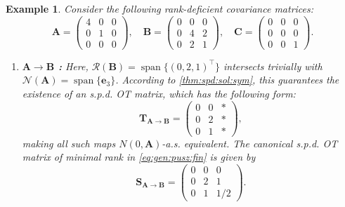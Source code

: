 \documentclass[noinfoline]{imsart}\setcounter{tocdepth}{2}
\newcommand{\m}[1]{\mathbf{#1}} %
\renewcommand{\c}[1]{\mathcal{#1}} %
\DeclareMathOperator*{\spann}{span}
\theoremstyle{plain}
\newtheorem{example}{Example}[section]
\begin{document}
\begin{example}\label{ex:spd:ex}
Consider the following rank-deficient covariance matrices:
\begin{equation*}
    \m{A} = \begin{pmatrix}
    4 & 0 & 0 \\
    0 & 1 & 0 \\
    0 & 0 & 0
    \end{pmatrix}, \quad \m{B} = \begin{pmatrix}
    0 & 0 & 0 \\
    0 & 4 & 2 \\
    0 & 2 & 1
    \end{pmatrix}, \quad \m{C} = \begin{pmatrix}
    0 & 0 & 0 \\
    0 & 0 & 0 \\
    0 & 0 & 1
    \end{pmatrix}.
\end{equation*}

\begin{enumerate}[leftmargin = *]
\item \textbf{$\m{A} \to \m{B}$ :} Here, $\c{R}(\m{B}) = \spann \{(0, 2, 1)^{\top}\}$ intersects trivially with $\c{N}(\m{A}) = \spann \{\m{e}_{3}\}$. According to \cref{thm:spd:sol:sym}, this guarantees the existence of an s.p.d. OT matrix, which has the following form:
\begin{equation*}
    \m{T}_{\m{A} \to \m{B}} = \begin{pmatrix}
    0 & 0 & * \\
    0 & 2 & * \\
    0 & 1 & *
    \end{pmatrix},
\end{equation*}
making all such maps $N(0, \m{A})$-a.s. equivalent. The canonical s.p.d. OT matrix of minimal rank in \eqref{eq:gen:pusz:fin} is given by
\begin{equation*}
    \m{S}_{\m{A} \to \m{B}} = \begin{pmatrix}
    0 & 0 & 0 \\
    0 & 2 & 1 \\
    0 & 1 & 1/2
    \end{pmatrix}.
\end{equation*}


\end{enumerate}
\end{example}
\end{document}
